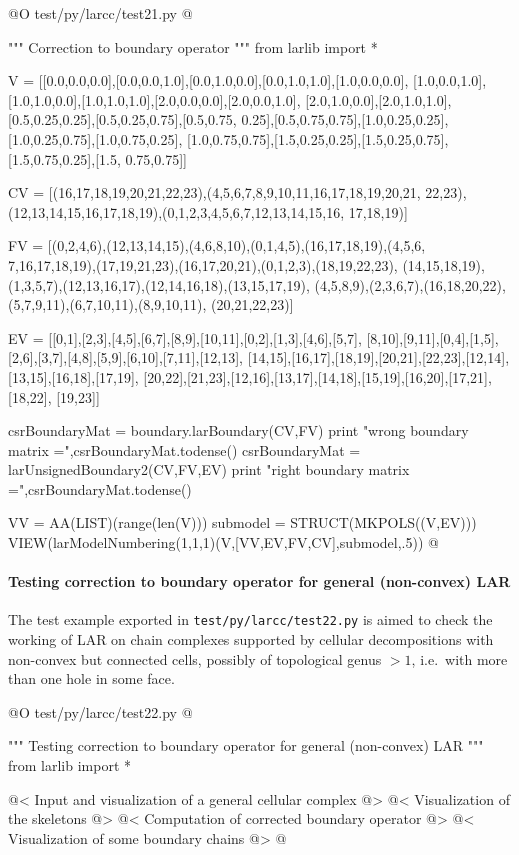 \documentclass[11pt,oneside]{article}    %
\begin{document}
@O test/py/larcc/test21.py
@{""" Correction to boundary operator """
from larlib import *

V = [[0.0,0.0,0.0],[0.0,0.0,1.0],[0.0,1.0,0.0],[0.0,1.0,1.0],[1.0,0.0,0.0],
[1.0,0.0,1.0],[1.0,1.0,0.0],[1.0,1.0,1.0],[2.0,0.0,0.0],[2.0,0.0,1.0],
[2.0,1.0,0.0],[2.0,1.0,1.0],[0.5,0.25,0.25],[0.5,0.25,0.75],[0.5,0.75,
0.25],[0.5,0.75,0.75],[1.0,0.25,0.25],[1.0,0.25,0.75],[1.0,0.75,0.25],
[1.0,0.75,0.75],[1.5,0.25,0.25],[1.5,0.25,0.75],[1.5,0.75,0.25],[1.5,
0.75,0.75]]

CV = [(16,17,18,19,20,21,22,23),(4,5,6,7,8,9,10,11,16,17,18,19,20,21,
22,23),(12,13,14,15,16,17,18,19),(0,1,2,3,4,5,6,7,12,13,14,15,16,
17,18,19)]

FV = [(0,2,4,6),(12,13,14,15),(4,6,8,10),(0,1,4,5),(16,17,18,19),(4,5,6,
7,16,17,18,19),(17,19,21,23),(16,17,20,21),(0,1,2,3),(18,19,22,23),
(14,15,18,19),(1,3,5,7),(12,13,16,17),(12,14,16,18),(13,15,17,19),
(4,5,8,9),(2,3,6,7),(16,18,20,22),(5,7,9,11),(6,7,10,11),(8,9,10,11),
(20,21,22,23)]

EV = [[0,1],[2,3],[4,5],[6,7],[8,9],[10,11],[0,2],[1,3],[4,6],[5,7],
[8,10],[9,11],[0,4],[1,5],[2,6],[3,7],[4,8],[5,9],[6,10],[7,11],[12,13],
[14,15],[16,17],[18,19],[20,21],[22,23],[12,14],[13,15],[16,18],[17,19],
[20,22],[21,23],[12,16],[13,17],[14,18],[15,19],[16,20],[17,21],[18,22],
[19,23]]

csrBoundaryMat = boundary.larBoundary(CV,FV)
print "wrong boundary matrix =",csrBoundaryMat.todense()
csrBoundaryMat = larUnsignedBoundary2(CV,FV,EV)
print "right boundary matrix =",csrBoundaryMat.todense()

VV = AA(LIST)(range(len(V)))
submodel = STRUCT(MKPOLS((V,EV)))
VIEW(larModelNumbering(1,1,1)(V,[VV,EV,FV,CV],submodel,.5)) 
@}


\paragraph{Testing correction to boundary operator for general (non-convex) LAR}

The test example exported in \texttt{test/py/larcc/test22.py} is aimed to check the working of LAR on chain complexes supported by cellular decompositions with non-convex but connected cells, possibly of topological genus $>1$, i.e.~with more than one hole in some face.

@O test/py/larcc/test22.py
@{""" Testing correction to boundary operator for general (non-convex) LAR """
from larlib import *

@< Input and visualization of a general cellular complex @>
@< Visualization of the skeletons @>
@< Computation of corrected boundary operator @>
@< Visualization of some boundary chains @>
@}
\end{document}
